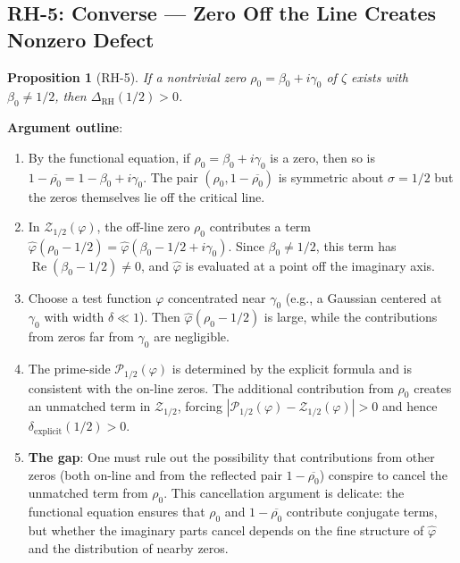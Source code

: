 \documentclass[11pt]{article}
\newtheorem{proposition}[theorem]{Proposition}
\theoremstyle{remark}
\DeclareMathOperator{\Rea}{Re}
\begin{document}
\subsection{RH-5: Converse --- Zero Off the Line Creates Nonzero Defect}
\label{subsec:RH5}

\begin{proposition}[RH-5]
If a nontrivial zero $\rho_0=\beta_0+i\gamma_0$ of $\zeta$ exists with
$\beta_0\neq 1/2$, then $\Delta_{\mathrm{RH}}(1/2)>0$.
\end{proposition}

\noindent\textbf{Argument outline}:
\begin{enumerate}
  \item By the functional equation, if $\rho_0=\beta_0+i\gamma_0$ is a zero, then so
    is $1-\overline{\rho_0}=1-\beta_0+i\gamma_0$.
    The pair $(\rho_0,1-\overline{\rho_0})$ is symmetric about $\sigma=1/2$
    but the zeros themselves lie off the critical line.

  \item In $\mathcal{Z}_{1/2}(\varphi)$, the off-line zero $\rho_0$ contributes a
    term $\hat{\varphi}(\rho_0-1/2)=\hat{\varphi}(\beta_0-1/2+i\gamma_0)$.
    Since $\beta_0\neq 1/2$, this term has $\Rea(\beta_0-1/2)\neq 0$, and
    $\hat{\varphi}$ is evaluated at a point off the imaginary axis.

  \item Choose a test function $\varphi$ concentrated near $\gamma_0$ (e.g., a
    Gaussian centered at $\gamma_0$ with width $\delta\ll 1$).
    Then $\hat{\varphi}(\rho_0-1/2)$ is large, while the contributions from zeros
    far from $\gamma_0$ are negligible.

  \item The prime-side $\mathcal{P}_{1/2}(\varphi)$ is determined by the explicit
    formula and is consistent with the on-line zeros.
    The additional contribution from $\rho_0$ creates an unmatched term in
    $\mathcal{Z}_{1/2}$, forcing
    $|\mathcal{P}_{1/2}(\varphi)-\mathcal{Z}_{1/2}(\varphi)|>0$ and hence
    $\delta_{\mathrm{explicit}}(1/2)>0$.

  \item \textbf{The gap}: One must rule out the possibility that contributions from
    other zeros (both on-line and from the reflected pair $1-\overline{\rho_0}$)
    conspire to cancel the unmatched term from $\rho_0$.
    This cancellation argument is delicate: the functional equation ensures that
    $\rho_0$ and $1-\overline{\rho_0}$ contribute conjugate terms, but whether
    the imaginary parts cancel depends on the fine structure of $\hat{\varphi}$
    and the distribution of nearby zeros.
\end{enumerate}
\end{document}
